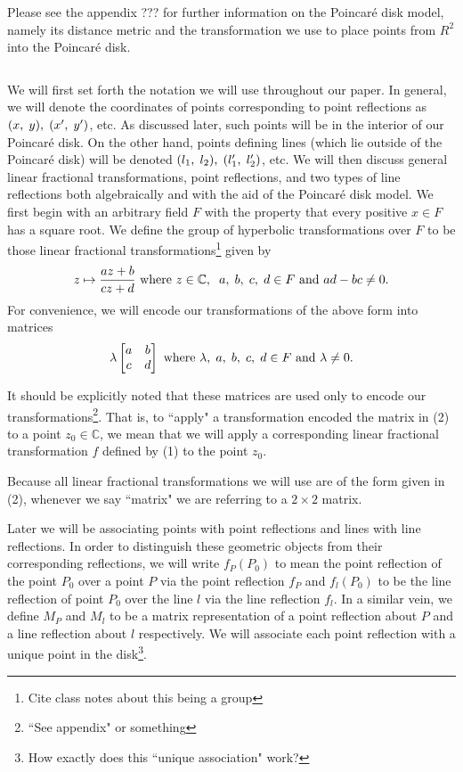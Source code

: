 \documentclass[12pt]{article}
\newcommand{\C}{\mathbb{C}}
\newcommand{\poincare}{Poincar\'{e} }
\newcommand{\ttc}{, \hspace{1mm}}
\newcommand{\lftmat}[4]{\begin{bmatrix} {#1} & {#2} \\ {#3} & {#4} \end{bmatrix}}
\newcommand{\stanlftmat}{\lftmat{a}{b}{c}{d}}
\theoremstyle{plain}
\theoremstyle{definition}
\begin{document}
Please see the appendix ??? for further information on the \poincare disk model, namely its distance metric and the transformation we use to place points from $R^2$ into the \poincare disk.





	
\[\]
	
We will first set forth the notation we will use throughout our paper. In general, we will denote the coordinates of points corresponding to point reflections as $(x \ttc y) \ttc (x' \ttc y')$, etc. As discussed later, such points will be in the interior of our \poincare disk. On the other hand, points defining lines (which lie outside of the \poincare disk) will be denoted $(l_1 \ttc l_2) \ttc (l_1' \ttc l_2')$, etc. We will then discuss general linear fractional transformations, point reflections, and two types of line reflections both algebraically and with the aid of the \poincare disk model. We first begin with an arbitrary field $F$ with the property that every positive $x \in F$ has a square root. We define the group of hyperbolic transformations over $F$ to be those linear fractional transformations\footnote{Cite class notes about this being a group} given by
\begin{equation} 
	z \mapsto \frac{az+b}{cz+d} \text{ where } z \in \C, \hspace{2mm} a \ttc b \ttc c \ttc d \in F \text{ and } ad-bc \neq 0. 
\end{equation}
For convenience, we will encode our transformations of the above form into matrices
\begin{equation}
	\lambda \stanlftmat \text{ where } \lambda \ttc a \ttc b \ttc c \ttc d \in F \text{ and } \lambda \neq 0. 
\end{equation}

It should be explicitly noted that these matrices are used only to encode our transformations\footnote{``See appendix" or something}. That is, to ``apply" a transformation encoded the matrix in (2) to a point $z_0 \in \C$, we mean that we will apply a corresponding linear fractional transformation $f$ defined by (1) to the point $z_0$. 

Because all linear fractional transformations we will use are of the form given in (2), whenever we say ``matrix" we are referring to a $2 \times 2$ matrix. 

Later we will be associating points with point reflections and lines with line reflections. In order to distinguish these geometric objects from their corresponding reflections, we will write $f_P(P_0)$ to mean the point reflection of the point $P_0$ over a point $P$ via the point reflection $f_P$ and $f_l(P_0)$ to be the line reflection of point $P_0$ over the line $l$ via the line reflection $f_l$. In a similar vein, we define $M_P$ and $M_l$ to be a matrix representation of a point reflection about $P$ and a line reflection about $l$ respectively. We will associate each point reflection with a unique point in the disk\footnote{How exactly does this ``unique association" work? }. 
\end{document}
